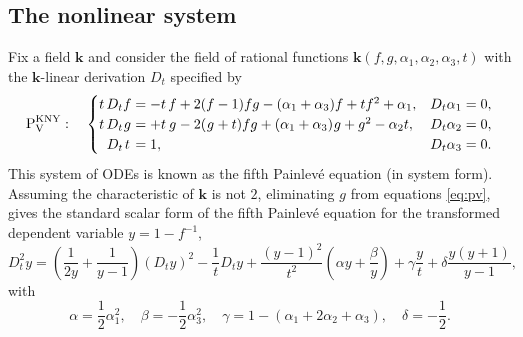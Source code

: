 \documentclass[a4paper,reqno]{amsart}
\numberwithin{equation}{section}
\numberwithin{figure}{section}
\theoremstyle{remark}
\newcommand\Pfive{\textrm{P}_{\textrm{V}}}
\begin{document}
\subsection{The nonlinear system}
Fix a field $\mathbf{k}$ and consider the field of rational functions $\mathbf{k}(f,g,\alpha_1,\alpha_2,\alpha_3,t)$ with the $\mathbf{k}$-linear derivation $D_t$ specified by
 \begin{equation}\label{eq:pv}
 \Pfive^\text{KNY}:\quad           \begin{cases}
       t\, D_t f=-t\,f+2(f-1)fg-(\alpha_1+\alpha_3)f+tf^2+\alpha_1, &   D_t \alpha_1=0, \\
  t\, D_t \hspace{0.2mm}g\hspace{0.1mm}=+t\,\hspace{0.2mm}g\hspace{0.1mm}-2(\hspace{0.2mm}g\hspace{0.1mm}+t)fg+(\alpha_1+\alpha_3)\hspace{0.2mm}g+g^2-\alpha_2 t, &   D_t \alpha_2=0, \\
      \hspace{1.9mm}    D_t \hspace{0.4mm}t\hspace{0.4mm}=1, &   D_t \alpha_3=0. \\ 
    \end{cases}
    \end{equation}
This system of ODEs is known as the fifth Painlev\'e equation (in system form). Assuming the characteristic of $\mathbf{k}$ is not $2$, eliminating $g$ from equations \eqref{eq:pv}, gives the standard scalar form of the fifth Painlev\'e equation for the transformed dependent variable $y=1-f^{-1}$,
\begin{equation}\label{eq:pvscal}
    D_t^2y=\left(\frac{1}{2y}+\frac{1}{y-1}\right)(D_ty)^2-\frac{1}{t}D_ty+\frac{(y-1)^2}{t^2}\left(\alpha y+\frac{\beta}{y}\right)+\gamma \frac{y}{t}+\delta \frac{y(y+1)}{y-1},
\end{equation}
with
\begin{equation}\label{eq:pvscal_par}
    \alpha=\frac{1}{2}\alpha_1^2,\quad \beta=-\frac{1}{2}\alpha_3^2,\quad
    \gamma=1-(\alpha_1+2\alpha_2+\alpha_3),\quad \delta=-\frac{1}{2}.
\end{equation}
\end{document}
